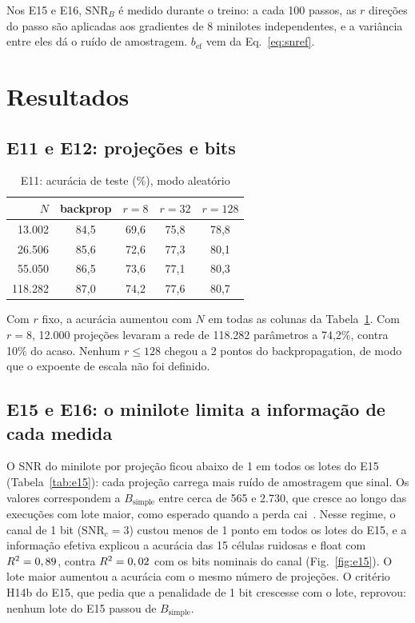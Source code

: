 \documentclass[journal]{IEEEtran}
\newcommand{\SNR}{\mathrm{SNR}}
\begin{document}
Nos E15 e E16, $\SNR_B$ é medido durante o treino: a cada 100 passos, as $r$ direções do passo são aplicadas aos gradientes de 8 minilotes independentes, e a variância entre eles dá o ruído de amostragem. $b_{\text{ef}}$ vem da Eq.~\eqref{eq:snref}.

\section{Resultados}

\subsection{E11 e E12: projeções e bits}

\begin{table}[t]
\centering
\caption{E11: acurácia de teste (\%), modo aleatório}
\label{tab:e11}
\begin{tabular}{rcccc}
\toprule
$N$ & backprop & $r=8$ & $r=32$ & $r=128$ \\
\midrule
13.002 & 84,5 & 69,6 & 75,8 & 78,8 \\
26.506 & 85,6 & 72,6 & 77,3 & 80,1 \\
55.050 & 86,5 & 73,6 & 77,1 & 80,3 \\
118.282 & 87,0 & 74,2 & 77,6 & 80,7 \\
\bottomrule
\end{tabular}
\end{table}

Com $r$ fixo, a acurácia aumentou com $N$ em todas as colunas da Tabela~\ref{tab:e11}. Com $r=8$, 12.000 projeções levaram a rede de 118.282 parâmetros a 74,2\%, contra 10\% do acaso. Nenhum $r \le 128$ chegou a 2 pontos do backpropagation, de modo que o expoente de escala não foi definido.

\EdozeTexto

\subsection{E15 e E16: o minilote limita a informação de cada medida}

\EquinzeTabela
\EquinzeFigura

O SNR do minilote por projeção ficou abaixo de 1 em todos os lotes do E15 (Tabela~\ref{tab:e15}): cada projeção carrega mais ruído de amostragem que sinal. Os valores correspondem a $B_{\text{simple}}$ entre cerca de 565 e 2.730, que cresce ao longo das execuções com lote maior, como esperado quando a perda cai~\cite{mccandlish2018}. Nesse regime, o canal de 1 bit ($\SNR_c = 3$) custou menos de 1 ponto em todos os lotes do E15, e a informação efetiva explicou a acurácia das 15 células ruidosas e float com $R^2 = 0,89$, contra $R^2 = 0,02$ com os bits nominais do canal (Fig.~\ref{fig:e15}). O lote maior aumentou a acurácia com o mesmo número de projeções. O critério H14b do E15, que pedia que a penalidade de 1 bit crescesse com o lote, reprovou: nenhum lote do E15 passou de $B_{\text{simple}}$.
\end{document}
